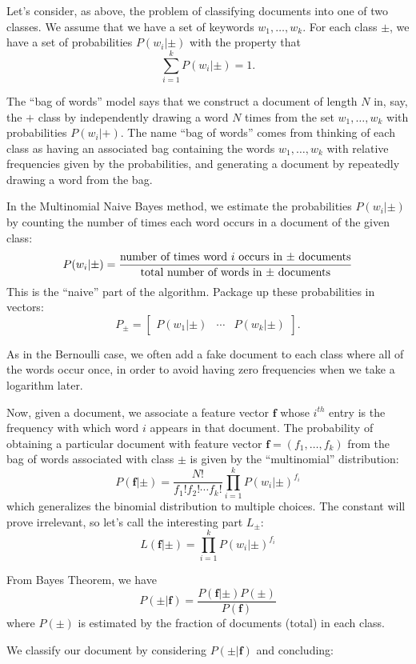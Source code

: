 \documentclass[
]{article}
\begin{document}
Let's consider, as above, the problem of classifying documents into one
of two classes. We assume that we have a set of keywords
\(w_1,\ldots, w_k\). For each class \(\pm\), we have a set of
probabilities \(P(w_i|\pm)\) with the property that \[
\sum_{i=1}^{k}P(w_{i}|\pm)=1.
\]

The ``bag of words'' model says that we construct a document of length
\(N\) in, say, the \(+\) class by independently drawing a word \(N\)
times from the set \(w_1,\ldots, w_k\) with probabilities
\(P(w_{i}|+)\). The name ``bag of words'' comes from thinking of each
class as having an associated bag containing the words
\(w_1,\ldots, w_k\) with relative frequencies given by the
probabilities, and generating a document by repeatedly drawing a word
from the bag.

In the Multinomial Naive Bayes method, we estimate the probabilities
\(P(w_{i}|\pm)\) by counting the number of times each word occurs in a
document of the given class: \[
P(w_{i}|\pm) = \frac{\hbox{\rm number of times word $i$ occurs in $\pm$ documents}}{\hbox{\rm total number of words in $\pm$ documents}}
\] This is the ``naive'' part of the algorithm. Package up these
probabilities in vectors: \[
P_{\pm} = \left[\begin{array}{ccc} P(w_{1}|\pm) & \cdots & P(w_{k}|\pm)\end{array}\right].
\]

As in the Bernoulli case, we often add a fake document to each class
where all of the words occur once, in order to avoid having zero
frequencies when we take a logarithm later.

Now, given a document, we associate a feature vector \(\mathbf{f}\)
whose \(i^{th}\) entry is the frequency with which word \(i\) appears in
that document. The probability of obtaining a particular document with
feature vector \(\mathbf{f}=(f_1,\ldots, f_k)\) from the bag of words
associated with class \(\pm\) is given by the ``multinomial''
distribution: \[
P(\mathbf{f}|\pm)=\frac{N!}{f_1!f_2!\cdots f_k!} \prod_{i=1}^{k} P(w_{i}|\pm)^{f_{i}}
\] which generalizes the binomial distribution to multiple choices. The
constant will prove irrelevant, so let's call the interesting part
\(L_{\pm}\): \[
L(\mathbf{f}|\pm)= \prod_{i=1}^{k} P(w_{i}|\pm)^{f_{i}}
\]

From Bayes Theorem, we have \[
P(\pm|\mathbf{f}) = \frac{P(\mathbf{f}|\pm)P(\pm)}{P(\mathbf{f})}
\] where \(P(\pm)\) is estimated by the fraction of documents (total) in
each class.

We classify our document by considering \(P(\pm|\mathbf{f})\) and
concluding:
\end{document}
